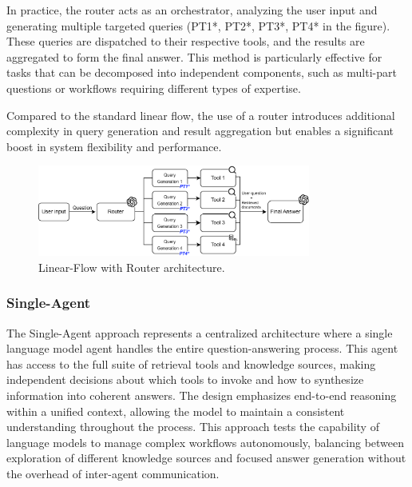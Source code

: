                 In practice, the router acts as an orchestrator, analyzing the user input and generating multiple targeted queries (PT1*, PT2*, PT3*, PT4* in the figure). These queries are dispatched to their respective tools, and the results are aggregated to form the final answer. This method is particularly effective for tasks that can be decomposed into independent components, such as multi-part questions or workflows requiring different types of expertise.
                
                Compared to the standard linear flow, the use of a router introduces additional complexity in query generation and result aggregation but enables a significant boost in system flexibility and performance.

                \begin{figure}[h]
                    \centering
                    \includegraphics[width=0.8\textwidth]{images_exp2/diagrama_linear_w_router.png}
                    \caption{Linear-Flow with Router architecture.}
                    \label{fig:diagrama_linear_w_router}
                \end{figure}
                
                

                
            \subsubsection{Single-Agent}

                The Single-Agent approach represents a centralized architecture where a single language model agent handles the entire question-answering process. This agent has access to the full suite of retrieval tools and knowledge sources, making independent decisions about which tools to invoke and how to synthesize information into coherent answers. The design emphasizes end-to-end reasoning within a unified context, allowing the model to maintain a consistent understanding throughout the process. This approach tests the capability of language models to manage complex workflows autonomously, balancing between exploration of different knowledge sources and focused answer generation without the overhead of inter-agent communication.
                
